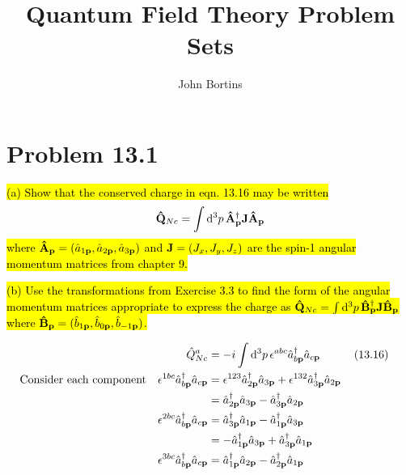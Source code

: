 \documentclass{article}
\title{Quantum Field Theory Problem Sets}
\author{John Bortins}
\begin{document}
\maketitle{}


\section*{Problem 13.1}
\begin{quoting}
  \hl{(a) Show that the conserved charge in eqn. 13.16 may be written}
  \[\vb{\hat{Q}}_{Nc}=\int\dd[3]{p}\vb{\hat{A}}^\dagger_{\vb{p}}\vb{J}\vb{\hat{A}}_{\vb{p}} \]
  \hl{where  $\vb{\hat{A}}_{\vb{p}}=(\hat{a}_{1\vb{p}},\hat{a}_{2\vb{p}},\hat{a}_{3\vb{p}})$ and  $\vb{J}=(J_x,J_y,J_z)$ are the spin-1 angular momentum matrices from chapter 9.}

  \hl{(b) Use the transformations from Exercise 3.3 to find the form of the angular momentum matrices appropriate to express the charge as  $\vb{\hat{Q}}_{Nc}=\int\dd[3]{p}\vb{\hat{B}}^\dagger_{\vb{p}}\vb{J}\vb{\hat{B}}_{\vb{p}}$ where $\vb{\hat{B}}_{\vb{p}}=(\hat{b}_{1\vb{p}},\hat{b}_{0\vb{p}},\hat{b}_{-1\vb{p}})$.}
\end{quoting}



\begin{align*}
  \hat{Q}^a_{Nc}                                                                        & =-i\int\dd[3]{p}\epsilon^{abc}\hat{a}^\dagger_{b\vb{p}}\hat{a}_{c\vb{p}}\qquad\qq{(13.16)}                         \\
  \qq*{Consider each component}\epsilon^{1bc}\hat{a}^\dagger_{b\vb{p}}\hat{a}_{c\vb{p}} & =\epsilon^{123}\hat{a}^\dagger_{2\vb{p}}\hat{a}_{3\vb{p}}+\epsilon^{132}\hat{a}^\dagger_{3\vb{p}}\hat{a}_{2\vb{p}} \\
                                                                                        & =\hat{a}^\dagger_{2\vb{p}}\hat{a}_{3\vb{p}}-\hat{a}^\dagger_{3\vb{p}}\hat{a}_{2\vb{p}}                             \\
  \epsilon^{2bc}\hat{a}^\dagger_{b\vb{p}}\hat{a}_{c\vb{p}}                              & =\hat{a}^\dagger_{3\vb{p}}\hat{a}_{1\vb{p}}-\hat{a}^\dagger_{1\vb{p}}\hat{a}_{3\vb{p}}                             \\
                                                                                        & =-\hat{a}^\dagger_{1\vb{p}}\hat{a}_{3\vb{p}}+\hat{a}^\dagger_{3\vb{p}}\hat{a}_{1\vb{p}}                            \\
  \epsilon^{3bc}\hat{a}^\dagger_{b\vb{p}}\hat{a}_{c\vb{p}}                              & =\hat{a}^\dagger_{1\vb{p}}\hat{a}_{2\vb{p}}-\hat{a}^\dagger_{2\vb{p}}\hat{a}_{1\vb{p}}                             \\
\end{align*}
\end{document}
